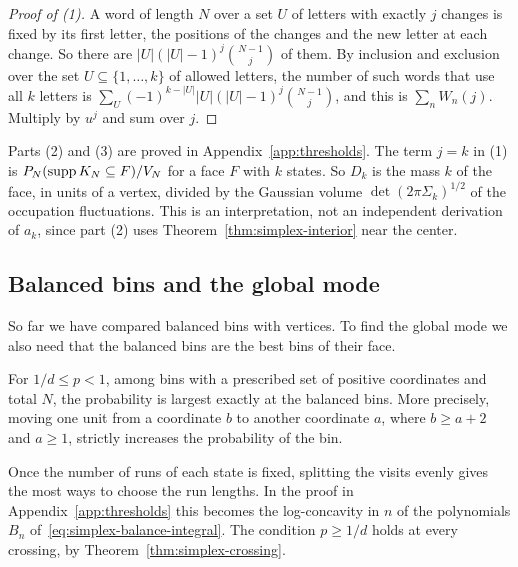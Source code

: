 \begin{proof}[Proof of (1)]
A word of length $N$ over a set $U$ of letters with exactly $j$ changes is
fixed by its first letter, the positions of the changes and the new letter at
each change. So there are $|U|(|U|-1)^j\binom{N-1}j$ of them. By inclusion and
exclusion over the set $U\subseteq\{1,\ldots,k\}$ of allowed letters, the number
of such words that use all $k$ letters is
$\sum_U(-1)^{k-|U|}|U|(|U|-1)^j\binom{N-1}j$, and this is $\sum_nW_n(j)$. Multiply
by $u^j$ and sum over $j$.
\end{proof}

Parts (2) and (3) are proved in Appendix~\ref{app:thresholds}. The term $j=k$ in
(1) is $P_N(\operatorname{supp} K_N\subseteq F)/V_N$ for a face $F$ with $k$ states. So $D_k$
is the mass $k$ of the face, in units of a vertex, divided by the Gaussian
volume $\det(2\pi\Sigma_k)^{1/2}$ of the occupation fluctuations. This is an
interpretation, not an independent derivation of $a_k$, since part (2) uses
Theorem~\ref{thm:simplex-interior} near the center.

\subsection{Balanced bins and the global mode}\label{sec:global-mode}

So far we have compared balanced bins with vertices. To find the global mode we
also need that the balanced bins are the best bins of their face.

\begin{theorem}\label{thm:simplex-balance}
For $1/d\le p<1$, among bins with a prescribed set of positive coordinates and
total $N$, the probability is largest exactly at the balanced bins. More
precisely, moving one unit from a coordinate $b$ to another coordinate $a$, where
$b\ge a+2$ and $a\ge1$, strictly increases the probability of the bin.
\end{theorem}

Once the number of runs of each state is fixed, splitting
the visits evenly gives the most ways to choose the run lengths. In the proof in
Appendix~\ref{app:thresholds} this becomes the log-concavity in $n$ of the
polynomials $B_n$ of~\eqref{eq:simplex-balance-integral}. The condition
$p\ge1/d$ holds at every crossing, by Theorem~\ref{thm:simplex-crossing}.

